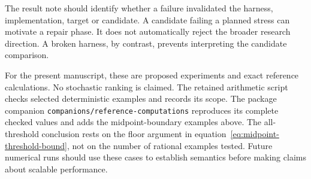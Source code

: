 The result note should identify whether a failure invalidated the harness, implementation, target or candidate. A candidate failing a planned stress can motivate a repair phase. It does not automatically reject the broader research direction. A broken harness, by contrast, prevents interpreting the candidate comparison.

For the present manuscript, these are proposed experiments and exact reference calculations. No stochastic ranking is claimed. The retained arithmetic script checks selected deterministic examples and records its scope. The package companion \texttt{companions/reference-computations} reproduces its complete checked values and adds the midpoint-boundary examples above. The all-threshold conclusion rests on the floor argument in equation~\eqref{eq:midpoint-threshold-bound}, not on the number of rational examples tested. Future numerical runs should use these cases to establish semantics before making claims about scalable performance.
